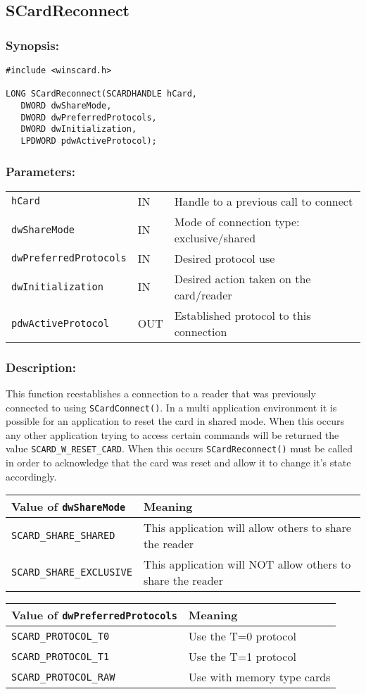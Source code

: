 \documentclass[a4paper,12pt]{article}
\newcommand{\synopsis}{\subsubsection{Synopsis:}}
\newcommand{\parameters}{\subsubsection{Parameters:}}
\newcommand{\desc}{\subsubsection{Description:}}
\begin{document}
\subsection{SCardReconnect}

\synopsis

\begin{verbatim}
#include <winscard.h>

LONG SCardReconnect(SCARDHANDLE hCard,
   DWORD dwShareMode,
   DWORD dwPreferredProtocols,
   DWORD dwInitialization,
   LPDWORD pdwActiveProtocol);
\end{verbatim}

\parameters

\begin{tabular}{lll}
\texttt{hCard} & IN & Handle to a previous call to connect\\
\texttt{dwShareMode} & IN & Mode of connection type: exclusive/shared\\
\texttt{dwPreferredProtocols} & IN & Desired protocol use\\
\texttt{dwInitialization} & IN & Desired action taken on the card/reader\\
\texttt{pdwActiveProtocol} & OUT & Established protocol to this connection\\
\end{tabular}

\desc

This function reestablishes a connection to a reader that was previously
connected to using \texttt{SCardConnect()}.  In a multi application
environment it is possible for an application to reset the card in
shared mode. When this occurs any other application trying to access
certain commands will be returned the value
\texttt{SCARD\_W\_RESET\_CARD}. When this occurs
\texttt{SCardReconnect()} must be called in order to acknowledge that
the card was reset and allow it to change it's state accordingly.


\begin{tabular}{|l|l|}
\hline
Value of \texttt{dwShareMode} & Meaning \\
\hline
\hline
\texttt{SCARD\_SHARE\_SHARED} & This application will allow others to share the
reader\\
\hline
\texttt{SCARD\_SHARE\_EXCLUSIVE} & This application will NOT allow others to
share the reader\\
\hline
\end{tabular}

\begin{tabular}{|l|l|}
\hline
Value of \texttt{dwPreferredProtocols} & Meaning \\
\hline
\hline
\texttt{SCARD\_PROTOCOL\_T0} & Use the T=0 protocol \\
\hline
\texttt{SCARD\_PROTOCOL\_T1} & Use the T=1 protocol \\
\hline
\texttt{SCARD\_PROTOCOL\_RAW} & Use with memory type cards \\
\hline
\end{tabular}
\end{document}
